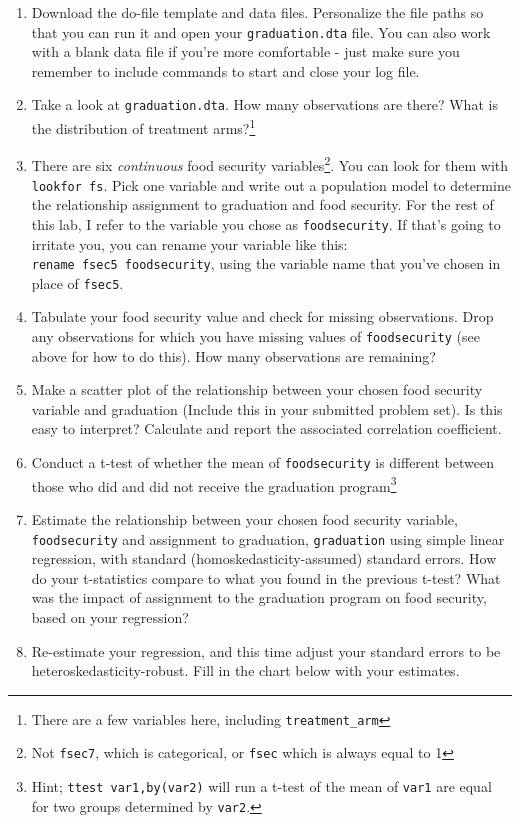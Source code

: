 \documentclass[11pt]{article}
\begin{document}
\begin{enumerate}
\def\labelenumi{\arabic{enumi}.}
\item
  Download the do-file template and data files. Personalize the file
  paths so that you can run it and open your \texttt{graduation.dta}
  file. You can also work with a blank data file if you're more
  comfortable - just make sure you remember to include commands to start
  and close your log file.
\item
  Take a look at \texttt{graduation.dta}. How many observations are
  there? What is the distribution of treatment arms?\footnote{There are
    a few variables here, including \texttt{treatment\_arm}}
\item
  There are six \emph{continuous} food security variables\footnote{Not
    \texttt{fsec7}, which is categorical, or \texttt{fsec} which is
    always equal to 1}. You can look for them with \texttt{lookfor\ fs}.
  Pick one variable and write out a population model to determine the
  relationship assignment to graduation and food security. For the rest
  of this lab, I refer to the variable you chose as
  \texttt{foodsecurity}. If that's going to irritate you, you can rename
  your variable like this: \texttt{rename\ fsec5\ foodsecurity}, using
  the variable name that you've chosen in place of \texttt{fsec5}.
\item
  Tabulate your food security value and check for missing observations.
  Drop any observations for which you have missing values of
  \texttt{foodsecurity} (see above for how to do this). How many
  observations are remaining?
\item
  Make a scatter plot of the relationship between your chosen food
  security variable and graduation (Include this in your submitted
  problem set). Is this easy to interpret? Calculate and report the
  associated correlation coefficient.
\item
  Conduct a t-test of whether the mean of \texttt{foodsecurity} is
  different between those who did and did not receive the graduation
  program\footnote{Hint; \texttt{ttest\ var1,by(var2)} will run a t-test
    of the mean of \texttt{var1} are equal for two groups determined by
    \texttt{var2}.}
\item
  Estimate the relationship between your chosen food security variable,
  \texttt{foodsecurity} and assignment to graduation,
  \texttt{graduation} using simple linear regression, with standard
  (homoskedasticity-assumed) standard errors. How do your t-statistics
  compare to what you found in the previous t-test? What was the impact
  of assignment to the graduation program on food security, based on
  your regression?
\item
  Re-estimate your regression, and this time adjust your standard errors
  to be heteroskedasticity-robust. Fill in the chart below with your
  estimates.
\end{enumerate}
\end{document}
